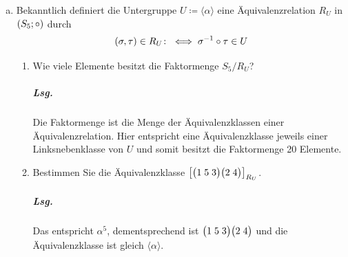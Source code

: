 \documentclass{scrreprt}
\begin{document}
\begin{enumerate}[(a)]
  \textbf{Alternativ nach der Übung:} von $\alpha^1$ bis $\alpha^6$ \\

  Nun ist bekannt, dass zwei Linksnebenklassen entweder identisch oder disjunkt
  sind.
  Weiter ist $\abs{S_5} = 5! = 120$ und die Zahl der Linksnebenklassen
  $\abs{S_5} / \abs{\langle \alpha \rangle} = 120 / 6 = 20$.

\newpage
\item Bekanntlich definiert die Untergruppe $U \coloneqq \langle \alpha \rangle$
  eine Äquivalenzrelation $R_U$ in $\qty(S_5; \circ)$ durch
  \[
    \qty(\sigma, \tau) \in R_U \colon\iff \sigma^{-1} \circ \tau \in U
  \]
  \begin{enumerate}[(1)]
  \item Wie viele Elemente besitzt die Faktormenge $S_5/R_U$?

    \subparagraph{Lsg.} Die Faktormenge ist die Menge der Äquivalenzklassen
    einer Äquivalenzrelation.
    Hier entspricht eine Äquivalenzklasse jeweils einer Linksnebenklasse von
    $U$ und somit besitzt die Faktormenge 20 Elemente.

  \item Bestimmen Sie die Äquivalenzklasse
    $\qty[\qty\big(1\;5\;3)\qty\big(2\;4)]_{R_U}$.

    \subparagraph{Lsg.} Das entspricht $\alpha^5$, dementsprechend ist
    $\qty\big(1\;5\;3)\qty\big(2\;4)$ und die Äquivalenzklasse
    ist gleich $\langle \alpha \rangle$.
  \end{enumerate}
\end{enumerate}
\end{document}
